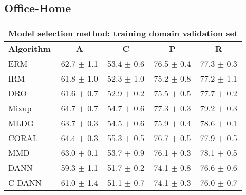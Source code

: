 \documentclass{article}
\begin{document}
\subsection{Office-Home}
\begin{center}
\begin{tabular}{lcccc}
\toprule
\multicolumn{5}{c}{\textbf{Model selection method: training domain validation set}} \\
\midrule
\textbf{Algorithm}    & \textbf{A}                & \textbf{C}                & \textbf{P}                & \textbf{R}                \\
\midrule
ERM                       & 62.7 $\pm$ 1.1            & 53.4 $\pm$ 0.6            & 76.5 $\pm$ 0.4            & 77.3 $\pm$ 0.3            \\
IRM                       & 61.8 $\pm$ 1.0            & 52.3 $\pm$ 1.0            & 75.2 $\pm$ 0.8            & 77.2 $\pm$ 1.1            \\
DRO                 & 61.6 $\pm$ 0.7            & 52.9 $\pm$ 0.2            & 75.5 $\pm$ 0.5            & 77.7 $\pm$ 0.2            \\
Mixup                     & 64.7 $\pm$ 0.7            & 54.7 $\pm$ 0.6            & 77.3 $\pm$ 0.3            & 79.2 $\pm$ 0.3            \\
MLDG                      & 63.7 $\pm$ 0.3            & 54.5 $\pm$ 0.6            & 75.9 $\pm$ 0.4            & 78.6 $\pm$ 0.1            \\
CORAL                     & 64.4 $\pm$ 0.3            & 55.3 $\pm$ 0.5            & 76.7 $\pm$ 0.5            & 77.9 $\pm$ 0.5            \\
MMD                       & 63.0 $\pm$ 0.1            & 53.7 $\pm$ 0.9            & 76.1 $\pm$ 0.3            & 78.1 $\pm$ 0.5            \\
DANN                       & 59.3 $\pm$ 1.1            & 51.7 $\pm$ 0.2            & 74.1 $\pm$ 0.8            & 76.6 $\pm$ 0.6            \\
C-DANN                   & 61.0 $\pm$ 1.4            & 51.1 $\pm$ 0.7            & 74.1 $\pm$ 0.3            & 76.0 $\pm$ 0.7            \\
\bottomrule
\end{tabular}
\end{center}
\end{document}
